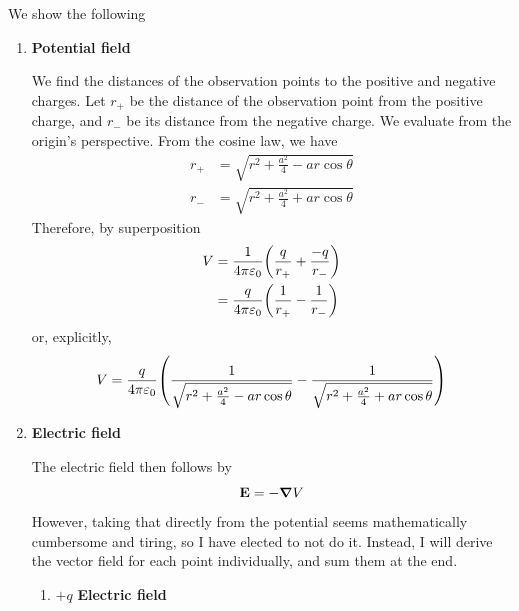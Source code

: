 		We show the following
		\begin{enumerate}
			\item \textbf{Potential field}

				  We find the distances of the observation points to the positive and negative charges. 
				  Let $r_+$ be the distance of the observation point from the positive charge, and $r_-$ be
				  its distance from the negative charge. We evaluate from the origin's perspective.
				  From the cosine law, we have
				  \begin{align}
					  r_+ &= \sqrt{r^2 + \frac{a^2}{4} - ar\cos\theta }\\
					  r_- &= \sqrt{r^2 + \frac{a^2}{4} + ar\cos\theta }
				  \end{align}
				  Therefore, by superposition
				  \begin{align}
					  V &= \frac{1}{4\pi\epsz}\pqty{
						  \frac{q}{r_+} + \frac{-q}{r_-}  
					  } \\
						&= \frac{q}{4\pi\epsz}\pqty{
						  \frac{1}{r_+} - \frac{1}{r_-}  
					  } 
				  \end{align}
				  or, explicitly,
				  \begin{equation}
					  V = \frac{q}{4\pi\epsz}\pqty{
						  \frac{1}{\sqrt{r^2 + \frac{a^2}{4} - ar\cos\theta }}
						  - 
						  \frac{1}{\sqrt{r^2 + \frac{a^2}{4} + ar\cos\theta }}
					  } 
				  \end{equation}
			\item \textbf{Electric field}
				  
				  The electric field then follows by
				  \begin{equation}
				      \vb{E} = -\grad V
				  \end{equation}
				  However, taking that directly from the potential seems mathematically
				  cumbersome and tiring, so I have elected to not do it. Instead, I will derive
				  the vector field for each point individually, and sum them at the end.
				  \begin{enumerate}
				      \item $+q$ \textbf{Electric field} 
						    

\end{enumerate}
\end{enumerate}
